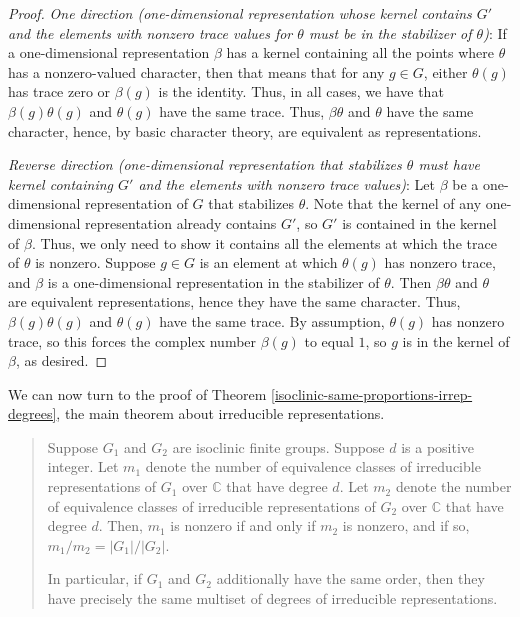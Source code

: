 \documentclass{ucetd}
\begin{document}
\begin{proof}
  {\em One direction (one-dimensional representation whose kernel
    contains $G'$ and the elements with nonzero trace values for
    $\theta$ must be in the stabilizer of $\theta$)}: If a
  one-dimensional representation $\beta$ has a kernel containing all
  the points where $\theta$ has a nonzero-valued character, then that
  means that for any $g \in G$, either $\theta(g)$ has trace zero or
  $\beta(g)$ is the identity. Thus, in all cases, we have that
  $\beta(g)\theta(g)$ and $\theta(g)$ have the same trace. Thus,
  $\beta\theta$ and $\theta$ have the same character, hence, by basic
  character theory, are equivalent as representations.

  {\em Reverse direction (one-dimensional representation that
    stabilizes $\theta$ must have kernel containing $G'$ and the
    elements with nonzero trace values)}: Let $\beta$ be a
  one-dimensional representation of $G$ that stabilizes $\theta$. Note
  that the kernel of any one-dimensional representation already
  contains $G'$, so $G'$ is contained in the kernel of $\beta$. Thus,
  we only need to show it contains all the elements at which the trace
  of $\theta$ is nonzero. Suppose $g \in G$ is an element at which
  $\theta(g)$ has nonzero trace, and $\beta$ is a one-dimensional
  representation in the stabilizer of $\theta$. Then $\beta \theta$
  and $\theta$ are equivalent representations, hence they have the
  same character. Thus, $\beta(g)\theta(g)$ and $\theta(g)$ have the
  same trace. By assumption, $\theta(g)$ has nonzero trace, so this
  forces the complex number $\beta(g)$ to equal $1$, so $g$ is in the
  kernel of $\beta$, as desired.
\end{proof}

We can now turn to the proof of Theorem
\ref{isoclinic-same-proportions-irrep-degrees}, the main theorem about
irreducible representations.

\begin{quote}
  Suppose $G_1$ and $G_2$ are isoclinic finite groups. Suppose $d$ is
  a positive integer. Let $m_1$ denote the number of equivalence
  classes of irreducible representations of $G_1$ over $\mathbb{C}$
  that have degree $d$. Let $m_2$ denote the number of equivalence
  classes of irreducible representations of $G_2$ over $\mathbb{C}$
  that have degree $d$. Then, $m_1$ is nonzero if and only if $m_2$ is
  nonzero, and if so, $m_1/m_2 = |G_1|/|G_2|$.

  In particular, if $G_1$ and $G_2$ additionally have the same order,
  then they have precisely the same multiset of degrees of irreducible
  representations.
\end{quote}
\end{document}
